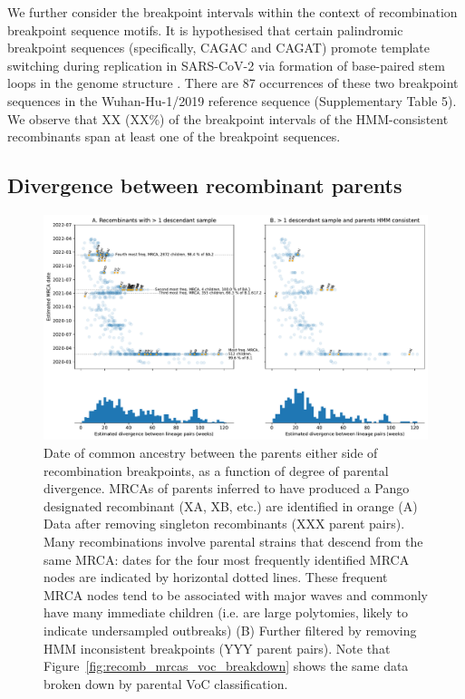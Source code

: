 \documentclass{article}
\begin{document}
We further consider the breakpoint intervals within the context of
recombination breakpoint sequence motifs. It is hypothesised that certain
palindromic breakpoint sequences (specifically, CAGAC and CAGAT) promote
template switching during replication in SARS-CoV-2 via formation of
base-paired stem loops in the genome structure \citep{Gallaher2020-lb}. There
are 87 occurrences of these two breakpoint sequences in the Wuhan-Hu-1/2019
reference sequence (Supplementary Table 5). We observe that XX (XX\%) of the
breakpoint intervals of the HMM-consistent recombinants span at least one of
the breakpoint sequences.

\subsection{Divergence between recombinant parents}

\begin{figure} \centering
\includegraphics[width=\textwidth]{figures/recombination_node_mrcas.pdf}
\caption{\label{fig:recomb_mrcas}
Date of common ancestry between the parents either side of recombination
breakpoints, as a function of degree of parental divergence. MRCAs of parents
inferred to have produced a Pango designated recombinant (XA, XB, etc.) are
identified in orange (A) Data after removing singleton recombinants (XXX parent
pairs). Many recombinations involve parental strains that descend from the same
MRCA: dates for the four most frequently identified MRCA nodes are indicated by
horizontal dotted lines. These frequent MRCA nodes tend to be associated with
major waves and commonly have many immediate children (i.e. are large
polytomies, likely to indicate undersampled outbreaks) (B) Further filtered by
removing HMM inconsistent breakpoints (YYY parent pairs). Note that
Figure~\ref{fig:recomb_mrcas_voc_breakdown} shows the same data broken down by
parental VoC classification.}
\end{figure}
\end{document}
